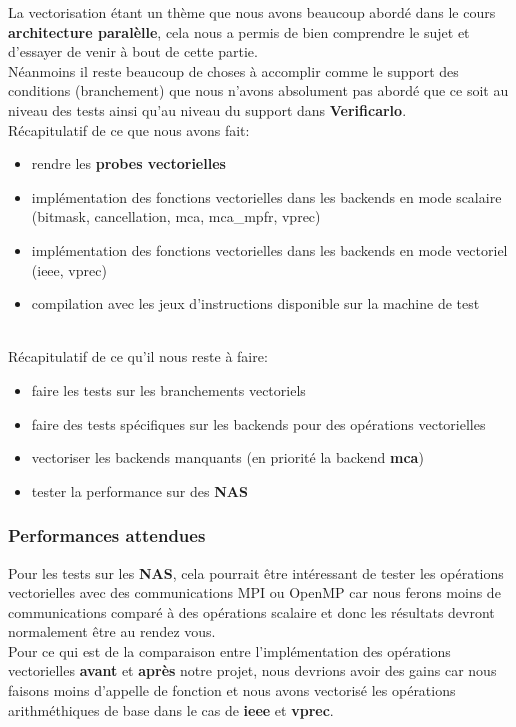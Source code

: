 \documentclass[11pt]{article}
\begin{document}
La vectorisation étant un thème que nous avons beaucoup abordé dans le cours
\textbf{architecture paralèlle}, cela nous a permis de bien comprendre le sujet et
d'essayer de venir à bout de cette partie.
\\ \vspace{5mm}
Néanmoins il reste beaucoup de choses à accomplir comme le support des
conditions (branchement) que nous n'avons absolument pas abordé que ce soit
au niveau des tests ainsi qu'au niveau du support dans \textbf{Verificarlo}.
\\ \vspace{5mm}
Récapitulatif de ce que nous avons fait:
\begin{itemize}
\item rendre les \textbf{probes vectorielles}
\item implémentation des fonctions vectorielles dans les backends en mode
scalaire (bitmask, cancellation, mca, mca\_mpfr, vprec)
\item implémentation des fonctions vectorielles dans les backends en mode
vectoriel (ieee, vprec)
\item compilation avec les jeux d'instructions disponible sur la machine de test
\end{itemize}
\\ \vspace{5mm}
Récapitulatif de ce qu'il nous reste à faire:
\begin{itemize}
\item faire les tests sur les branchements vectoriels
\item faire des tests spécifiques sur les backends pour des opérations
vectorielles
\item vectoriser les backends manquants (en priorité la backend \textbf{mca})
\item tester la performance sur des \textbf{NAS}
\end{itemize}

\subsubsection{Performances attendues}
\label{sec:org90e85d4}

Pour les tests sur les \textbf{NAS}, cela pourrait être intéressant de tester les
opérations vectorielles avec des communications MPI ou OpenMP car nous ferons
moins de communications comparé à des opérations scalaire et donc les
résultats devront normalement être au rendez vous.
\\ \vspace{5mm}
Pour ce qui est de la comparaison entre l'implémentation des opérations
vectorielles \textbf{avant} et \textbf{après} notre projet, nous devrions avoir des gains
car nous faisons moins d'appelle de fonction et nous avons vectorisé les
opérations arithméthiques de base dans le cas de \textbf{ieee} et \textbf{vprec}.
\end{document}
